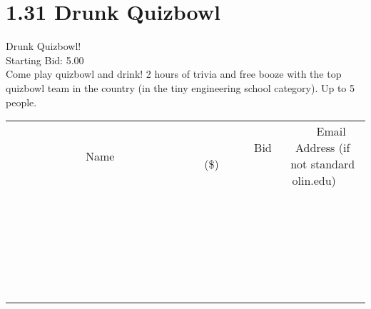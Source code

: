 \documentclass[11pt]{article}
\begin{document}
					\section*{1.31 Drunk Quizbowl}
					Drunk Quizbowl! \\
					Starting Bid: 5.00 \\
					Come play quizbowl and drink!  2 hours of trivia and free booze with the top quizbowl team in the country (in the tiny engineering school category). Up to 5 people. \\
					[6ex]
					\begin{tabular}{c c c}
						~~~~~~~~~~~~~Name~~~~~~~~~~~~~ & ~~~~~~~~~Bid (\$)~~~~~~~~~ & ~~~Email Address (if not standard olin.edu)~~~ \\
				
 & & \\
\hline
 & & \\
\hline
 & & \\
\hline
 & & \\
\hline
 & & \\
\hline
 & & \\
\hline
 & & \\
\hline
 & & \\
\hline
 & & \\
\hline
 & & \\
\hline
 & & \\
\hline
 & & \\
\hline
 & & \\
\hline
 & & \\
\hline
 & & \\
\hline
 & & \\
\hline
 & & \\
\hline
 & & \\
\hline
 & & \\
\hline
 & & \\
\hline
 & & \\
\hline
 & & \\
\hline
 & & \\
\hline
 & & \\
\hline
 & & \\
\hline
 & & \\
\hline
					\end{tabular}
					\clearpage
				
\end{document}

